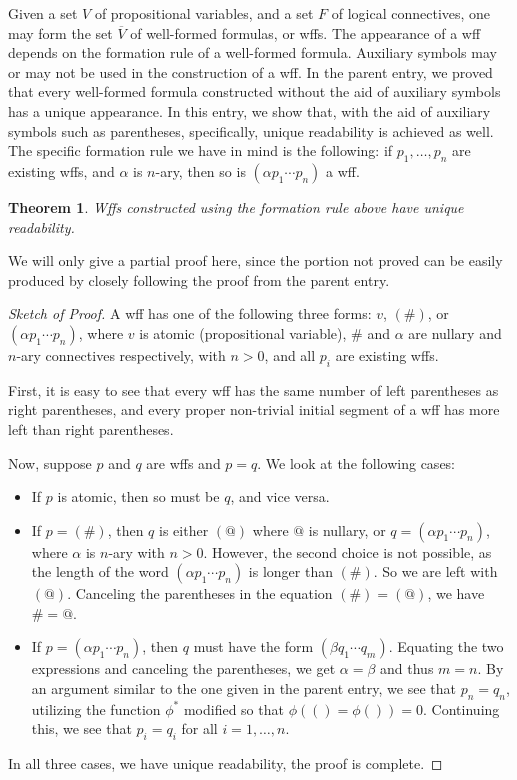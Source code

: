\documentclass[12pt]{article}
\newtheorem{thm}{Theorem}
\begin{document}
Given a set $V$ of propositional variables, and a set $F$ of logical connectives, one may form the set $\overline{V}$ of well-formed formulas, or wffs.  The appearance of a wff depends on the formation rule of a well-formed formula.  Auxiliary symbols may or may not be used in the construction of a wff.  In the parent entry, we proved that every well-formed formula constructed without the aid of auxiliary symbols has a unique appearance.  In this entry, we show that, with the aid of auxiliary symbols such as parentheses, specifically, unique readability is achieved as well.  The specific formation rule we have in mind is the following: if $p_1,\ldots, p_n$ are existing wffs, and $\alpha$ is $n$-ary, then so is $(\alpha p_1 \cdots p_n)$ a wff.

\begin{thm}  Wffs constructed using the formation rule above have unique readability. \end{thm}

We will only give a partial proof here, since the portion not proved can be easily produced by closely following the proof from the parent entry.

\begin{proof}[Sketch of Proof]  A wff has one of the following three forms: $v$, $(\#)$, or $(\alpha p_1 \cdots p_n)$, where $v$ is atomic (propositional variable), $\#$ and $\alpha$ are nullary and $n$-ary connectives respectively, with $n>0$, and all $p_i$ are existing wffs.  

First, it is easy to see that every wff has the same number of left parentheses as right parentheses, and every proper non-trivial initial segment of a wff has more left than right parentheses.  

Now, suppose $p$ and $q$ are wffs and $p=q$.  We look at the following cases:
\begin{itemize}
\item If $p$ is atomic, then so must be $q$, and vice versa.
\item If $p = (\#)$, then $q$ is either $(@)$ where $@$ is nullary, or $q=(\alpha p_1 \cdots p_n)$, where $\alpha$ is $n$-ary with $n>0$.  However, the second choice is not possible, as the length of the word $(\alpha p_1 \cdots p_n)$ is longer than $(\#)$.  So we are left with $(@)$.  Canceling the parentheses in the equation $(\#)=(@)$, we have $\#=@$.
\item If $p=(\alpha p_1 \cdots p_n)$, then $q$ must have the form $(\beta q_1 \cdots q_m)$.  Equating the two expressions and canceling the parentheses, we get $\alpha =\beta$ and thus $m=n$.  By an argument similar to the one given in the parent entry, we see that $p_n=q_n$, utilizing the function $\phi^*$ modified so that $\phi(()=\phi())=0$.  Continuing this, we see that $p_i=q_i$ for all $i=1,\ldots, n$.
\end{itemize}
In all three cases, we have unique readability, the proof is complete.
\end{proof}
\end{document}
